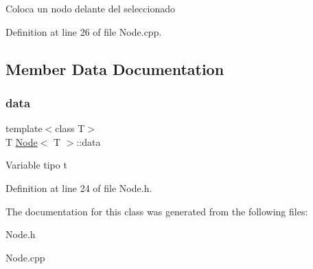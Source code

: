Coloca un nodo delante del seleccionado 

Definition at line 26 of file Node.\+cpp.



\subsection{Member Data Documentation}
\mbox{\label{class_node_ac450c71a8677a38d306361f9ced518d3}} 
\subsubsection{\texorpdfstring{data}{data}}
{\footnotesize\ttfamily template$<$class T$>$ \\
T \hyperlink{class_node}{Node}$<$ T $>$\+::data}

Variable tipo t 

Definition at line 24 of file Node.\+h.



The documentation for this class was generated from the following files\+:\begin{DoxyCompactItemize}
\item 
Node.\+h\item 
Node.\+cpp\end{DoxyCompactItemize}
